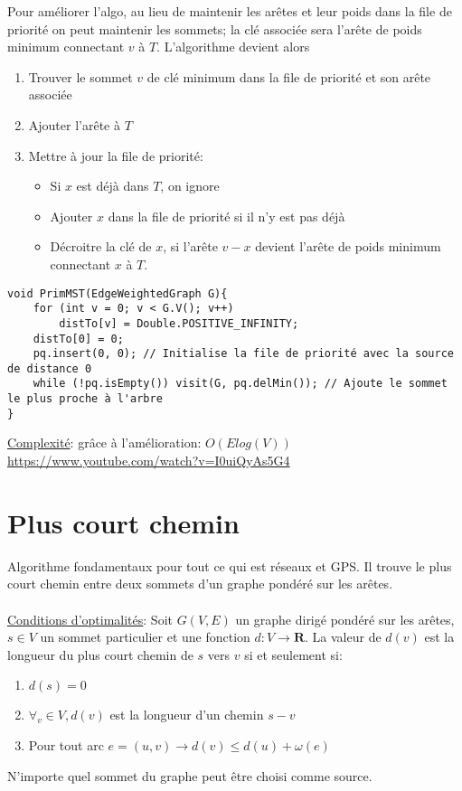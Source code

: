 \documentclass[10pt]{article}
\begin{document}
Pour améliorer l'algo, au lieu de maintenir les arêtes et leur poids dans la file de priorité on peut maintenir les sommets; la clé associée sera l'arête de poids minimum connectant $v$ à $T$.
L'algorithme devient alors
\begin{enumerate}
\item Trouver le sommet $v$ de clé minimum dans la file de priorité et son arête associée
\item Ajouter l'arête à $T$
\item Mettre à jour la file de priorité:
\begin{itemize}
\item Si $x$ est déjà dans $T$, on ignore
\item Ajouter $x$ dans la file de priorité si il n'y est pas déjà
\item Décroitre la clé de $x$, si l'arête $v-x$ devient l'arête de poids minimum connectant $x$ à $T$.
\end{itemize}
\end{enumerate}

\begin{verbatim}
void PrimMST(EdgeWeightedGraph G){
	for (int v = 0; v < G.V(); v++)
		distTo[v] = Double.POSITIVE_INFINITY;
	distTo[0] = 0;
	pq.insert(0, 0); // Initialise la file de priorité avec la source de distance 0
	while (!pq.isEmpty()) visit(G, pq.delMin()); // Ajoute le sommet le plus proche à l'arbre
}
\end{verbatim}

\underline{Complexité}: grâce à l'amélioration: $O(Elog(V))$
\\\url{https://www.youtube.com/watch?v=I0uiQyAs5G4}

\section{Plus court chemin}
Algorithme fondamentaux pour tout ce qui est réseaux et GPS.
Il trouve le plus court chemin entre deux sommets d'un graphe pondéré sur les arêtes.
\\
\\\underline{Conditions d'optimalités}:
Soit $G(V, E)$ un graphe dirigé pondéré sur les arêtes, $s \in V$ un sommet particulier et une fonction $d : V \rightarrow \mathbf{R}$. La valeur de $d(v)$ est la longueur du plus court chemin de $s$ vers $v$ si et seulement si:
\begin{enumerate}
\item $d(s) = 0$
\item $\forall_v \in V, d(v)$ est la longueur d'un chemin $s-v$
\item Pour tout arc $e = (u, v) \rightarrow d(v) \leqslant d(u) + \omega(e)$
\end{enumerate}
N'importe quel sommet du graphe peut être choisi comme source.
\end{document}
